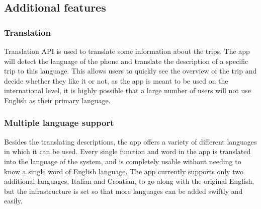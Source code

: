 \subsection{Additional features}
\subsubsection{Translation}
\hspace{\parindent}Translation API is used to translate some information about the trips. The app will detect the language of the phone and translate the description of a specific trip to this language. This allows users to quickly see the overview of the trip and decide whether they like it or not, as the app is meant to be used on the international level, it is highly possible that a large number of users will not use English as their primary language.
\subsubsection{Multiple language support}
\hspace{\parindent}Besides the translating descriptions, the app offers a variety of different languages in which it can be used. Every single function and word in the app is translated into the language of the system, and is completely usable without needing to know a single word of English language. The app currently supports only two additional languages, Italian and Croatian, to go along with the original English, but the infrastructure is set so that more languages can be added swiftly and easily.


